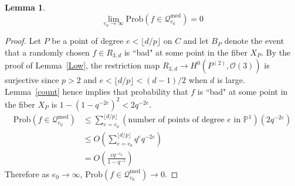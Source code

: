 \documentclass[12pt]{article}
\theoremstyle{plain}
\newtheorem{lemma}[equation]{Lemma}
\theoremstyle{definition}
\newcommand{\IP}{\mathbb{P}}
\newcommand{\sO}{\mathcal{O}}
\newcommand{\sQ}{\mathcal{Q}}
\newcommand{\<}{\langle}
\renewcommand{\>}{\rangle}
\newcommand{\Prob}{\mathrm{Prob}}
\begin{document}
\begin{lemma}
\label{Medium}
$$\lim_{e_0 \to \infty} \Prob( f \in  \sQ_{e_0}^{\mathrm{med}}) = 0 $$
\end{lemma}
\begin{proof}
Let $P$ be a point of degree $e < \lfloor d/p \rfloor$ on $C$ and let $B_P$ denote the event that a randomly chosen $f \in R_{3, d}$ is ``bad" at some point in the fiber $X_P$. By the proof of Lemma~\ref{Low}, the restriction map $R_{3, d} \to H^0(P^{(2)}, \sO(3))$ is surjective since $p > 2$ and $e < \lfloor d/p \rfloor < (d-1)/2$ when $d$ is large. Lemma~\ref{count} hence implies that probability that $f$ is ``bad" at some point in the fiber $X_P$ is $1 - (1 - q^{-2e})^2 < 2q^{-2e}$. 
\begin{align*}
\Prob(f \in \sQ_{e_0}^{\mathrm{med}}) &\le \sum_{e = e_0}^{\lfloor d/p \rfloor} (\text{number of points of degree $e$ in $\IP^1$})(2q^{-2e}) \\
&\le O(\sum_{e = e_0}^{\lfloor d/p \rfloor}q^{e} q^{-2e})\\
&= O(\frac{c q^{-e_0}}{1 - q^{-1}})
\end{align*}
Therefore as $e_0 \to \infty$, $\Prob(f \in \sQ_{e_0}^{\mathrm{med}}) \to 0$. 
\end{proof}
\end{document}
